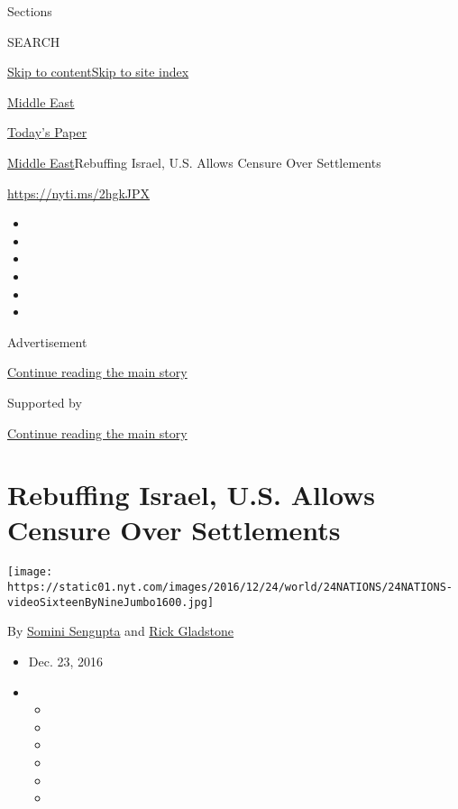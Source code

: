 Sections

SEARCH

\protect\hyperlink{site-content}{Skip to
content}\protect\hyperlink{site-index}{Skip to site index}

\href{https://www.nytimes.com/section/world/middleeast}{Middle East}

\href{https://myaccount.nytimes.com/auth/login?response_type=cookie\&client_id=vi}{}

\href{https://www.nytimes.com/section/todayspaper}{Today's Paper}

\href{/section/world/middleeast}{Middle East}\textbar{}Rebuffing Israel,
U.S. Allows Censure Over Settlements

\url{https://nyti.ms/2hgkJPX}

\begin{itemize}
\item
\item
\item
\item
\item
\item
\end{itemize}

Advertisement

\protect\hyperlink{after-top}{Continue reading the main story}

Supported by

\protect\hyperlink{after-sponsor}{Continue reading the main story}

\hypertarget{rebuffing-israel-us-allows-censure-over-settlements}{%
\section{Rebuffing Israel, U.S. Allows Censure Over
Settlements}\label{rebuffing-israel-us-allows-censure-over-settlements}}

\texttt{[image: https://static01.nyt.com/images/2016/12/24/world/24NATIONS/24NATIONS-videoSixteenByNineJumbo1600.jpg]}

By \href{http://www.nytimes.com/by/somini-sengupta}{Somini Sengupta} and
\href{https://www.nytimes.com/by/rick-gladstone}{Rick Gladstone}

\begin{itemize}
\item
  Dec. 23, 2016
\item
  \begin{itemize}
  \item
  \item
  \item
  \item
  \item
  \item
  \end{itemize}
\end{itemize}


